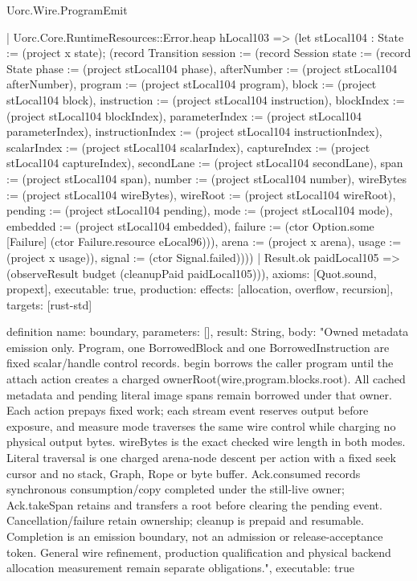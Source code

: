 \begin{lexlean}{Uorc.Wire.ProgramEmit}
\begin{semanticmodule}
{      | Uorc.Core.RuntimeResources::Error.heap hLocal103 => (let stLocal104 : State := (project x state); (record Transition {session := (record Session {state := (record State {phase := (project stLocal104 phase), afterNumber := (project stLocal104 afterNumber), program := (project stLocal104 program), block := (project stLocal104 block), instruction := (project stLocal104 instruction), blockIndex := (project stLocal104 blockIndex), parameterIndex := (project stLocal104 parameterIndex), instructionIndex := (project stLocal104 instructionIndex), scalarIndex := (project stLocal104 scalarIndex), captureIndex := (project stLocal104 captureIndex), secondLane := (project stLocal104 secondLane), span := (project stLocal104 span), number := (project stLocal104 number), wireBytes := (project stLocal104 wireBytes), wireRoot := (project stLocal104 wireRoot), pending := (project stLocal104 pending), mode := (project stLocal104 mode), embedded := (project stLocal104 embedded), failure := (ctor Option.some [Failure] (ctor Failure.resource eLocal96))}), arena := (project x arena), usage := (project x usage)}), signal := (ctor Signal.failed)})))
    | Result.ok paidLocal105 => (observeResult budget (cleanupPaid paidLocal105))),
  axioms: [Quot.sound, propext],
  executable: true,
  production: {effects: [allocation, overflow, recursion], targets: [rust-std]}
}

definition{
  name: boundary,
  parameters: [],
  result: String,
  body: "Owned metadata emission only. Program, one BorrowedBlock and one BorrowedInstruction are fixed scalar/handle control records. begin borrows the caller program until the attach action creates a charged ownerRoot(wire,program.blocks.root). All cached metadata and pending literal image spans remain borrowed under that owner. Each action prepays fixed work; each stream event reserves output before exposure, and measure mode traverses the same wire control while charging no physical output bytes. wireBytes is the exact checked wire length in both modes. Literal traversal is one charged arena-node descent per action with a fixed seek cursor and no stack, Graph, Rope or byte buffer. Ack.consumed records synchronous consumption/copy completed under the still-live owner; Ack.takeSpan retains and transfers a root before clearing the pending event. Cancellation/failure retain ownership; cleanup is prepaid and resumable. Completion is an emission boundary, not an admission or release-acceptance token. General wire refinement, production qualification and physical backend allocation measurement remain separate obligations.",
  executable: true
}
\end{semanticmodule}
\end{lexlean}
